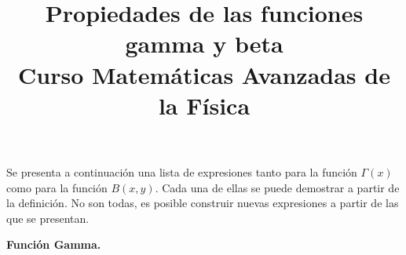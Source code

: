 
\setlength{\jot}{12pt}
\title{Propiedades de las funciones gamma y beta \\ {\large Curso Matemáticas Avanzadas de la Física}\vspace{-1.5\baselineskip}}
\author{}
\date{}

\maketitle
\fontsize{14}{14}\selectfont
Se presenta a continuación una lista de expresiones tanto para la función $\Gamma (x)$ como para la función $B (x, y)$. Cada una de ellas se puede demostrar a partir de la definición. No son todas, es posible construir nuevas expresiones a partir de las que se presentan.
\\\hspace*{\fill}

\textbf{Función Gamma.}

